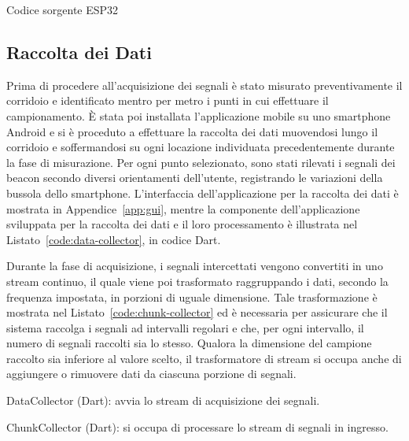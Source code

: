 \begin{listing}[htp]
	\caption{Codice sorgente ESP32}
	\label{code:esp32}
\end{listing}

\subsection{Raccolta dei Dati}
Prima di procedere all'acquisizione dei segnali è stato misurato
preventivamente il corridoio e identificato mentro per metro i punti in cui
effettuare il campionamento. È stata poi installata l'applicazione mobile su
uno smartphone Android e si è proceduto a effettuare la raccolta dei dati
muovendosi lungo il corridoio e soffermandosi su ogni locazione individuata
precedentemente durante la fase di misurazione. Per ogni punto selezionato,
sono stati rilevati i segnali dei beacon secondo diversi orientamenti
dell'utente, registrando le variazioni della bussola dello smartphone.
L'interfaccia dell'applicazione per la raccolta dei dati è mostrata in
Appendice~\ref{app:gui}, mentre la componente dell'applicazione sviluppata per
la raccolta dei dati e il loro processamento è illustrata nel
Listato~\ref{code:data-collector}, in codice Dart.

Durante la fase di acquisizione, i segnali intercettati vengono convertiti in
uno stream continuo, il quale viene poi trasformato raggruppando i dati,
secondo la frequenza impostata, in porzioni di uguale dimensione. Tale
trasformazione è mostrata nel Listato~\ref{code:chunk-collector} ed è
necessaria per assicurare che il sistema raccolga i segnali ad intervalli
regolari e che, per ogni intervallo, il numero di segnali raccolti sia lo
stesso. Qualora la dimensione del campione raccolto sia inferiore al valore
scelto, il trasformatore di stream si occupa anche di aggiungere o rimuovere
dati da ciascuna porzione di segnali.

\begin{listing}[htp]
	\caption{DataCollector (Dart): avvia lo stream di acquisizione dei segnali.}
  \label{code:data-collector}
\end{listing}

\begin{listing}[htp]
	\caption{ChunkCollector (Dart): si occupa di processare lo stream di segnali in
    ingresso.}
  \label{code:chunk-collector}
\end{listing}


